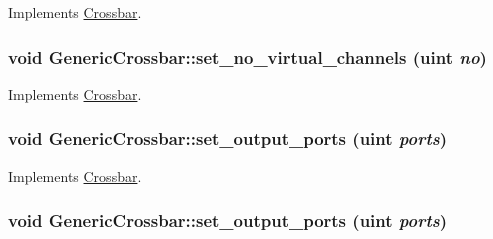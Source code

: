 Implements \hyperlink{classCrossbar_e7da6eea8ab565f26513dfe52d1516f5}{Crossbar}.\hypertarget{classGenericCrossbar_e9d67e36be87ea3169baa80ae52044e3}{
\subsubsection[{set\_\-no\_\-virtual\_\-channels}]{\setlength{\rightskip}{0pt plus 5cm}void GenericCrossbar::set\_\-no\_\-virtual\_\-channels ({\bf uint} {\em no})}}
\label{classGenericCrossbar_e9d67e36be87ea3169baa80ae52044e3}




Implements \hyperlink{classCrossbar_e7da6eea8ab565f26513dfe52d1516f5}{Crossbar}.\hypertarget{classGenericCrossbar_5b9a2875ec8a1bb19683304ae31e3364}{
\subsubsection[{set\_\-output\_\-ports}]{\setlength{\rightskip}{0pt plus 5cm}void GenericCrossbar::set\_\-output\_\-ports ({\bf uint} {\em ports})}}
\label{classGenericCrossbar_5b9a2875ec8a1bb19683304ae31e3364}




Implements \hyperlink{classCrossbar_291346aae5dfeee7ef946ee3addc3877}{Crossbar}.\hypertarget{classGenericCrossbar_5b9a2875ec8a1bb19683304ae31e3364}{
\subsubsection[{set\_\-output\_\-ports}]{\setlength{\rightskip}{0pt plus 5cm}void GenericCrossbar::set\_\-output\_\-ports ({\bf uint} {\em ports})}}
\label{classGenericCrossbar_5b9a2875ec8a1bb19683304ae31e3364}





